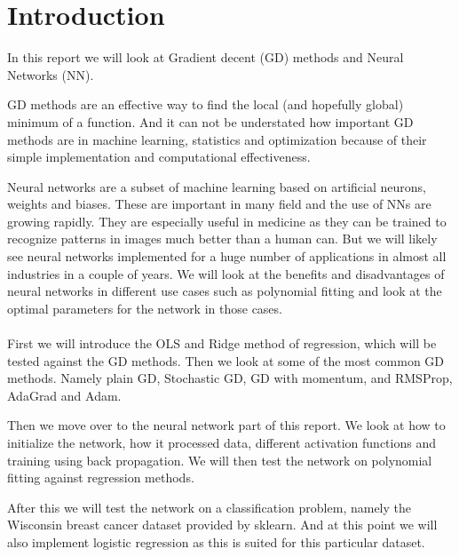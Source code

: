 \section{Introduction}


\begin{comment}
    In this report we will look at ...
    Motivate the reader, the first part of the introduction gives always a
    motivation and tries to give the overarching ideas. What I have done. 
    The structure of the report, how it is organised. Explain structure of the rapport at the end of intro. 
\end{comment}

In this report we will look at Gradient decent (GD) methods and Neural Networks
(NN).

GD methods are an effective way to find the local (and hopefully global)
minimum of a function. And it can not be understated how important GD methods
are in machine learning, statistics and optimization because of their simple
implementation and computational effectiveness.

Neural networks are a subset of machine learning based on artificial neurons,
weights and biases. These are important in many field and the use of NNs
are growing rapidly. They are especially useful in medicine as they can be
trained to recognize patterns in images much better than a human can. But we
will likely see neural networks implemented for a huge number of applications
in almost all industries in a couple of years. We will look at the benefits and
disadvantages of neural networks in different use cases such as polynomial
fitting and look at the optimal parameters for the network in those cases.
\\~\\
First we will introduce the OLS and Ridge method of regression, which will be
tested against the GD methods. Then we look at some of the most common GD methods. Namely plain
GD, Stochastic GD, GD with momentum, and RMSProp, AdaGrad and Adam. 

Then we move over to the neural network part of this report. We look at how to
initialize the network, how it processed data, different activation functions and
training using back propagation. We will then test the network on polynomial
fitting against regression methods.

After this we will test the network on a classification problem, namely
the Wisconsin breast cancer dataset provided by sklearn. And at this point we
will also implement logistic regression as this is suited for this particular
dataset. 
